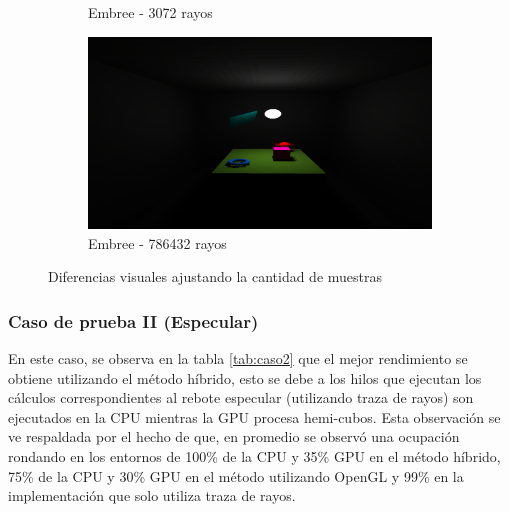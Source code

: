 \begin{figure}[htbp]
\begin{subfigure}{0.45\textwidth}
		\caption{Embree - 3072 rayos}
	\end{subfigure}
	\begin{subfigure}{0.45\textwidth}
		\includegraphics[width=1\linewidth]{assets/512srt}
		\caption{Embree - 786432 rayos}
	\end{subfigure}
	\caption{Diferencias visuales ajustando la cantidad de muestras}
	\label{img:difres}
\end{figure}

\subsubsection{Caso de prueba II (Especular)}

En este caso, se observa en la tabla \ref{tab:caso2} que el mejor rendimiento se obtiene utilizando el método híbrido, esto se debe a los hilos que ejecutan los cálculos correspondientes al rebote especular (utilizando traza de rayos) son ejecutados en la CPU mientras la GPU procesa hemi-cubos. Esta observación se ve respaldada por el hecho de que, en promedio se observó una ocupación rondando en los entornos de 100\% de la CPU y 35\% GPU en el método híbrido, 75\% de la CPU y 30\% GPU en el método utilizando OpenGL y 99\% en la implementación que solo utiliza traza de rayos. 


